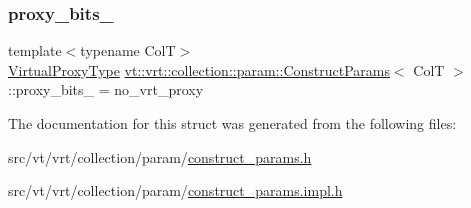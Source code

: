 \mbox{\label{structvt_1_1vrt_1_1collection_1_1param_1_1_construct_params_a459e1541fd22e637a616ca1f1f899124}} 
\subsubsection{\texorpdfstring{proxy\+\_\+bits\+\_\+}{proxy\_bits\_}}
{\footnotesize\ttfamily template$<$typename ColT$>$ \\
\hyperlink{namespacevt_a1b417dd5d684f045bb58a0ede70045ac}{Virtual\+Proxy\+Type} \hyperlink{structvt_1_1vrt_1_1collection_1_1param_1_1_construct_params}{vt\+::vrt\+::collection\+::param\+::\+Construct\+Params}$<$ ColT $>$\+::proxy\+\_\+bits\+\_\+ = no\+\_\+vrt\+\_\+proxy\hspace{0.3cm}{\ttfamily [private]}}



The documentation for this struct was generated from the following files\+:\begin{DoxyCompactItemize}
\item 
src/vt/vrt/collection/param/\hyperlink{construct__params_8h}{construct\+\_\+params.\+h}\item 
src/vt/vrt/collection/param/\hyperlink{construct__params_8impl_8h}{construct\+\_\+params.\+impl.\+h}\end{DoxyCompactItemize}
